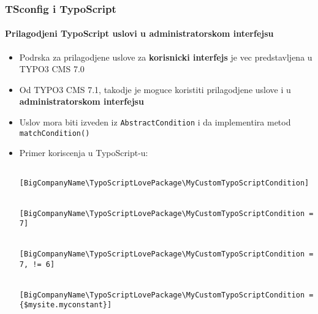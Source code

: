 
\begin{frame}[fragile]
	\frametitle{TSconfig i TypoScript}
	\framesubtitle{Prilagodjeni TypoScript uslovi u administratorskom interfejsu}

	\lstset{basicstyle=\tiny\ttfamily}

	\begin{itemize}
	
		\item Podrska za prilagodjene uslove za \textbf{korisnicki interfejs} je vec predstavljena u TYPO3 CMS 7.0
		\item Od TYPO3 CMS 7.1, takodje je moguce koristiti prilagodjene uslove i u \textbf{administratorskom interfejsu}
		\item Uslov mora biti izveden iz \texttt{AbstractCondition} i da implementira metod \texttt{matchCondition()}
		\item Primer koriscenja u TypoScript-u: 

			\begin{lstlisting}
				[BigCompanyName\TypoScriptLovePackage\MyCustomTypoScriptCondition]

				[BigCompanyName\TypoScriptLovePackage\MyCustomTypoScriptCondition = 7]

				[BigCompanyName\TypoScriptLovePackage\MyCustomTypoScriptCondition = 7, != 6]

				[BigCompanyName\TypoScriptLovePackage\MyCustomTypoScriptCondition = {$mysite.myconstant}]
			\end{lstlisting}

	\end{itemize}

\end{frame}


